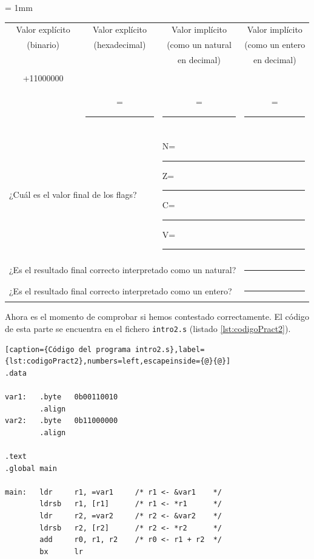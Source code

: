 \begin{center}
\small
\colorbox[gray]{0.9}{
\tabcolsep = 1mm
\begin{tabular}{cccc}
Valor explícito & Valor explícito & Valor implícito & Valor implícito \\
(binario) & (hexadecimal) & (como un natural & (como un entero \\
& & en decimal) & en decimal) \\
\colorbox[gray]{1}{
\begin{minipage}[b]{2cm}
\begin{flushright}
00110010\\
+11000000\\[-3mm]
\hrulefill
\end{flushright}
\vspace{0.4cm}
\end{minipage}
} &
= \colorbox[gray]{1}{\rule{0cm}{0.46cm}\rule{2cm}{0cm}} &
= \colorbox[gray]{1}{\rule{0cm}{0.46cm}\rule{2cm}{0cm}} &
= \colorbox[gray]{1}{\rule{0cm}{0.46cm}\rule{2cm}{0cm}} \\
\\
\multicolumn{2}{l}{
¿Cuál es el valor final de los flags?} &
\multicolumn{2}{l}{
\colorbox[gray]{1}{\rule{0cm}{0.46cm}N=\rule{0.7cm}{0cm}Z=\rule{0.7cm}{0cm}C=\rule{0.7cm}{0cm}V=\rule{0.7cm}{0cm}}
}\\[1mm]
\multicolumn{3}{l}{
¿Es el resultado final correcto interpretado como un natural?} &
\multicolumn{1}{l}{
\colorbox[gray]{1}{\rule{1cm}{0cm}\rule{0cm}{0.46cm}}} \\[1mm]
\multicolumn{3}{l}{
¿Es el resultado final correcto interpretado como un entero?} &
\multicolumn{1}{l}{
\colorbox[gray]{1}{\rule{1cm}{0cm}\rule{0cm}{0.46cm}}} \\
\end{tabular}
}
\end{center}

Ahora es el momento de comprobar si hemos contestado correctamente.
El código de esta parte se encuentra en el fichero {\tt intro2.s}
(listado \ref{lst:codigoPract2}).

\begin{lstlisting}[caption={Código del programa intro2.s},label={lst:codigoPract2},numbers=left,escapeinside={@}{@}]
.data

var1:   .byte   0b00110010
        .align
var2:   .byte   0b11000000
        .align

.text
.global main
 
main:   ldr     r1, =var1     /* r1 <- &var1    */
        ldrsb   r1, [r1]      /* r1 <- *r1      */
        ldr     r2, =var2     /* r2 <- &var2    */
        ldrsb   r2, [r2]      /* r2 <- *r2      */
        add     r0, r1, r2    /* r0 <- r1 + r2  */
        bx      lr
\end{lstlisting}


